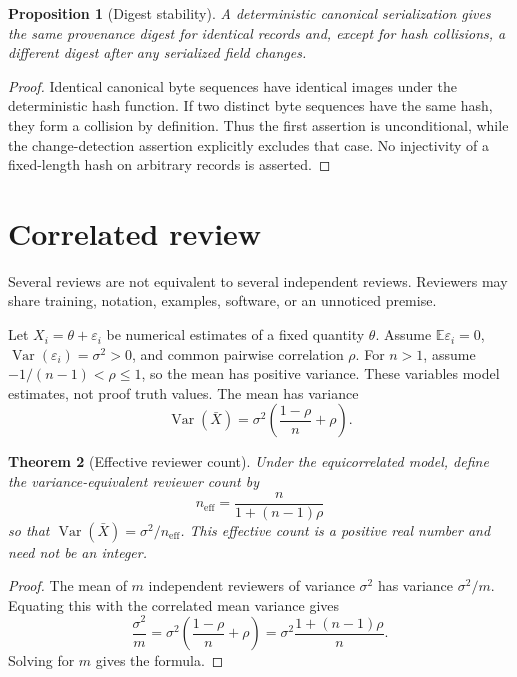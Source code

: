 \documentclass[11pt,oneside]{article}
\theoremstyle{komorebiplain}
\newtheorem{theorem}{Theorem}[section]
\newtheorem{proposition}[theorem]{Proposition}
\theoremstyle{komorebidefinition}
\theoremstyle{komorebiremark}
\begin{document}
\begin{proposition}[Digest stability]
\label{res:16:3}
A deterministic canonical serialization gives the same provenance digest for identical records and, except for hash collisions, a different digest after any serialized field changes.
\end{proposition}

\begin{proof}
Identical canonical byte sequences have identical images under the deterministic hash function. If two distinct byte sequences have the same hash, they form a collision by definition. Thus the first assertion is unconditional, while the change-detection assertion explicitly excludes that case. No injectivity of a fixed-length hash on arbitrary records is asserted.
\end{proof}


\section{Correlated review}
\label{sec:old17}
\label{sec:correlated-review}

Several reviews are not equivalent to several independent reviews. Reviewers may share training, notation, examples, software, or an unnoticed premise.

Let $X_i=\theta+\varepsilon_i$ be numerical estimates of a fixed quantity $\theta$. Assume $\mathbb E\varepsilon_i=0$, $\operatorname{Var}(\varepsilon_i)=\sigma^2>0$, and common pairwise correlation $\rho$. For $n>1$, assume $-1/(n-1)<\rho\leq1$, so the mean has positive variance. These variables model estimates, not proof truth values. The mean has variance
\[
\operatorname{Var}(\bar X)
=
\sigma^2\left(\frac{1-\rho}{n}+\rho\right).
\]

\begin{theorem}[Effective reviewer count]
\label{res:17:1}
\label{thm:review-count}
Under the equicorrelated model, define the variance-equivalent reviewer count by
\[
\boxed{
 n_{\mathrm{eff}}
 =
 \frac{n}{1+(n-1)\rho}
}
\]
so that $\operatorname{Var}(\bar X)=\sigma^2/n_{\mathrm{eff}}$. This effective count is a positive real number and need not be an integer.
\end{theorem}

\begin{proof}
The mean of $m$ independent reviewers of variance $\sigma^2$ has variance $\sigma^2/m$. Equating this with the correlated mean variance gives
\[
\frac{\sigma^2}{m}
=
\sigma^2\left(\frac{1-\rho}{n}+\rho\right)
=
\sigma^2\frac{1+(n-1)\rho}{n}.
\]
Solving for $m$ gives the formula.
\end{proof}
\end{document}

